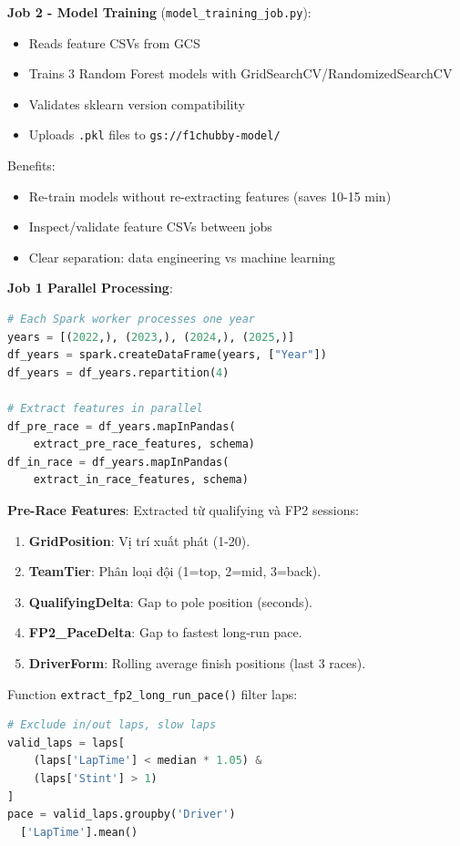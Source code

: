 \documentclass[conference,10pt]{IEEEtran}
\begin{document}
\textbf{Job 2 - Model Training} (\texttt{model\_training\_job.py}):
\begin{itemize}
    \item Reads feature CSVs from GCS
    \item Trains 3 Random Forest models with GridSearchCV/RandomizedSearchCV
    \item Validates sklearn version compatibility
    \item Uploads \texttt{.pkl} files to \texttt{gs://f1chubby-model/}
\end{itemize}

Benefits:
\begin{itemize}
    \item Re-train models without re-extracting features (saves 10-15 min)
    \item Inspect/validate feature CSVs between jobs
    \item Clear separation: data engineering vs machine learning
\end{itemize}

\textbf{Job 1 Parallel Processing}:
\begin{lstlisting}[language=Python]
# Each Spark worker processes one year
years = [(2022,), (2023,), (2024,), (2025,)]
df_years = spark.createDataFrame(years, ["Year"])
df_years = df_years.repartition(4)

# Extract features in parallel
df_pre_race = df_years.mapInPandas(
    extract_pre_race_features, schema)
df_in_race = df_years.mapInPandas(
    extract_in_race_features, schema)
\end{lstlisting}

\textbf{Pre-Race Features}:
Extracted từ qualifying và FP2 sessions:
\begin{enumerate}
    \item \textbf{GridPosition}: Vị trí xuất phát (1-20).
    \item \textbf{TeamTier}: Phân loại đội (1=top, 2=mid, 3=back).
    \item \textbf{QualifyingDelta}: Gap to pole position (seconds).
    \item \textbf{FP2\_PaceDelta}: Gap to fastest long-run pace.
    \item \textbf{DriverForm}: Rolling average finish positions (last 3 races).
\end{enumerate}

Function \texttt{extract\_fp2\_long\_run\_pace()} filter laps:
\begin{lstlisting}[language=Python]
# Exclude in/out laps, slow laps
valid_laps = laps[
    (laps['LapTime'] < median * 1.05) &
    (laps['Stint'] > 1)
]
pace = valid_laps.groupby('Driver')
  ['LapTime'].mean()
\end{lstlisting}
\end{document}
